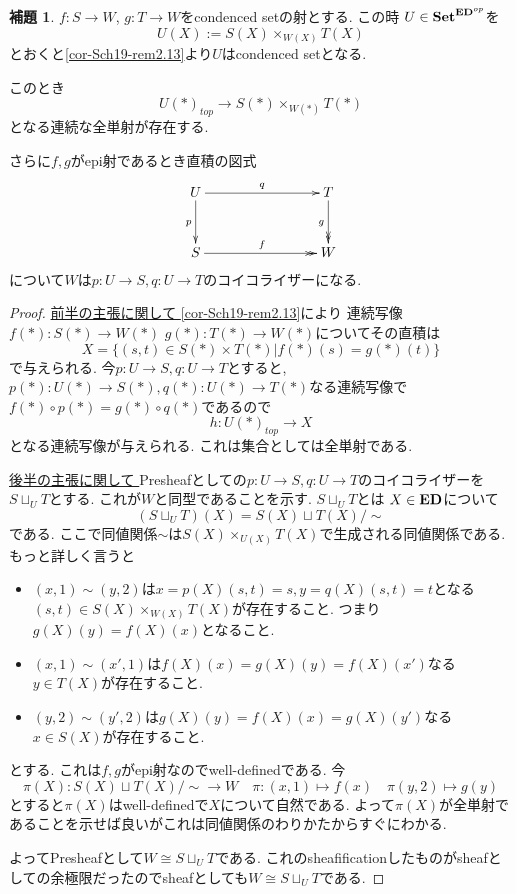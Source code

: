 \documentclass[dvipdfmx,a4paper,11pt]{article}
\theoremstyle{definition}
\newtheorem{lem}[thm]{補題}
\begin{document}
 \begin{tcolorbox}
 [colback = white, colframe = green!35!black, fonttitle = \bfseries,breakable = true]
  \begin{lem}\cite[Lemma 3.6.2]{Bar22}
\label{lem-ep-pullback}
$f: S \to W$, $g : T \to W$をcondenced setの射とする.
この時
 $U  \in {\bf Set}^{ { \bf ED }^{op}}$を
 $$
 U(X) := S(X) \times_{W(X)} T(X) 
 $$
とおくと\ref{cor-Sch19-rem2.13}より$U$はcondenced setとなる.  %

このとき$$U(\ast)_{top} \to S(\ast) \times_{W(\ast)} T(\ast)$$となる連続な全単射が存在する.

さらに$f, g$がepi射であるとき直積の図式
 \begin{equation*}
 \xymatrix@C=80pt@R=30pt{
U \ar@{->}[r]^{q}
\ar@{->}[d]_{p}
&T \ar@{->>}[d]_{g}
\\
S\ar@{->>}[r]^{f}
&W
 \\   
}
\end{equation*}
について$W$は$p : U \to S, q: U \to T$のコイコライザーになる. 

 \end{lem}
  \end{tcolorbox}
 \begin{proof}
   \underline{前半の主張に関して }
   \ref{cor-Sch19-rem2.13}により
連続写像$f(\ast) : S(\ast) \to W(\ast)$ $g(\ast) : T(\ast) \to W(\ast)$についてその直積は
 $$
 X =  \{(s,t) \in S(\ast) \times T(\ast) | f(\ast)(s) = g(\ast)(t) \}
 $$
 で与えられる. 今$p : U \to S, q : U \to T$とすると, $p(\ast) : U(\ast)  \to S(\ast) , q(\ast)  : U (\ast) \to T(\ast) $なる連続写像で$f(\ast)\circ p(\ast) = g(\ast) \circ q(\ast)$であるので
 $$
 h : U(\ast)_{top} \to  X
 $$
 となる連続写像が与えられる.  これは集合としては全単射である.
 
   \underline{後半の主張に関して }
 Presheafとしての$p : U \to S, q: U \to T$のコイコライザーを$S \sqcup_{U}T$とする.
 これが$W$と同型であることを示す. 
$S \sqcup_{U}T$とは
$X \in {\bf ED}$について
$$
(S \sqcup_{U}T)(X)
=
S(X) \sqcup T(X)/\sim
$$
である. ここで同値関係$\sim$は$S(X) \times_{U(X)} T(X)$で生成される同値関係である.
もっと詳しく言うと
\begin{itemize}
\item $(x,1) \sim (y , 2)$は$x=p(X)(s,t)=s, y=q(X)(s,t)=t$となる$(s,t) \in S(X) \times_{W(X)} T(X) $が存在すること. つまり$g(X)(y)=f(X)(x)$となること. 
\item $(x,1) \sim (x', 1)$は$f(X)(x)=g(X)(y)=f(X)(x')$なる$y \in T(X)$が存在すること.
\item $(y,2) \sim (y' , 2)$は$g(X)(y)=f(X)(x)=g(X)(y')$なる$x \in S(X)$が存在すること.
\end{itemize}
とする. 
これは$f, g$がepi射なのでwell-definedである. 
今
$$
\pi(X): S(X) \sqcup T(X)/\sim \to W
\quad
\pi : (x,1) \mapsto f(x)
\quad
\pi (y,2) \mapsto g(y)
$$
とすると$\pi(X)$はwell-definedで$X$について自然である.
よって$\pi(X)$が全単射であることを示せば良いがこれは同値関係のわりかたからすぐにわかる. 

よってPresheafとして$W \cong S \sqcup_{U}T$である.
これのsheafificationしたものがsheafとしての余極限だったのでsheafとしても$W \cong S \sqcup_{U}T$である. 
 \end{proof}
 
\end{document}
